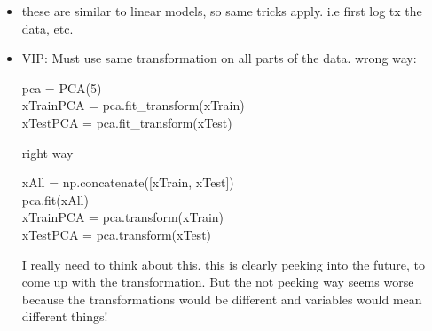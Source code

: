 \documentclass[a4paper]{report}
\newcommand{\brown}{\color{brown}}
\newenvironment{tightcenter}{
  \setlength\topsep{0pt}
  \setlength\parskip{0pt}
  \begin{center}
  }{
  \end{center}
}
\newenvironment{codesnip}[1]
{\begin{tightcenter}\begin{minipage}{.85\textwidth}#1}
{\end{minipage}\end{tightcenter}}
\begin{document}
\begin{itemize}
\begin{itemize}
      \item these are similar to linear models, so same tricks apply. i.e first log tx the data, etc.
      \item VIP: Must use same transformation on all parts of the data.
	\subitem wrong way:
	\begin{codesnip}{\brown}
	  pca = PCA(5) \\
	  xTrainPCA = pca.fit\_transform(xTrain)\\
	  xTestPCA = pca.fit\_transform(xTest)\\
	\end{codesnip}
	\subitem right way
	\begin{codesnip}{\brown}
	  xAll = np.concatenate([xTrain, xTest]) \\
	  pca.fit(xAll) \\
	  xTrainPCA = pca.transform(xTrain) \\
	  xTestPCA = pca.transform(xTest) 
	\end{codesnip}
	{\color{red} I really need to think about this. this is clearly peeking into the future, to come up with the transformation. But the not peeking way seems worse because the transformations would be different and variables would mean different things!}
    \end{itemize}
\end{itemize}
\end{document}
